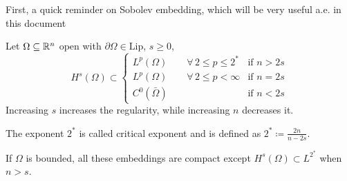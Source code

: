     First, a quick reminder on Sobolev embedding, which will be very useful a.e. in this document
    \begin{remark}
        Let \(\Omega \subseteq \mathbb{R}^n\) open with \(\partial\Omega \in \text{Lip}\), \(s \geq 0\),
        \[
            H^s(\Omega) \subset 
            \begin{cases}
                L^p(\Omega) \qquad \forall \, 2 \leq p \leq 2^* & \text{if } n > 2s \\
                L^p(\Omega) \qquad \forall \, 2 \leq p < \infty & \text{if } n = 2s \\
                C^0(\bar{\Omega})  & \text{if } n < 2s
            \end{cases}
        \]
        Increasing \(s\) increases the regularity, while increasing \(n\) decreases it.
    
        The exponent \(2^*\) is called critical exponent and is defined as \(2^* \coloneqq \frac{2n}{n - 2s}\).
    
        If \(\Omega\) is bounded, all these embeddings are compact except \(H^s(\Omega) \subset L^{2^*}\) when \(n > s\).
    \end{remark}
    
